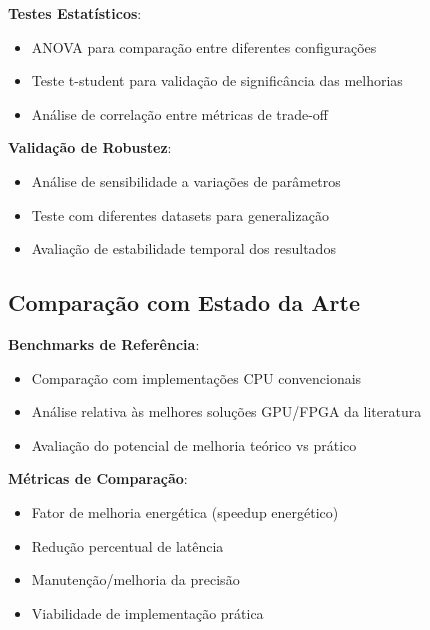 \textbf{Testes Estatísticos}:
\begin{itemize}
\item ANOVA para comparação entre diferentes configurações
\item Teste t-student para validação de significância das melhorias
\item Análise de correlação entre métricas de trade-off
\end{itemize}

\textbf{Validação de Robustez}:
\begin{itemize}
\item Análise de sensibilidade a variações de parâmetros
\item Teste com diferentes datasets para generalização
\item Avaliação de estabilidade temporal dos resultados
\end{itemize}

\subsection{Comparação com Estado da Arte}

\textbf{Benchmarks de Referência}:
\begin{itemize}
\item Comparação com implementações CPU convencionais
\item Análise relativa às melhores soluções GPU/FPGA da literatura
\item Avaliação do potencial de melhoria teórico vs prático
\end{itemize}

\textbf{Métricas de Comparação}:
\begin{itemize}
\item Fator de melhoria energética (speedup energético)
\item Redução percentual de latência
\item Manutenção/melhoria da precisão
\item Viabilidade de implementação prática
\end{itemize}